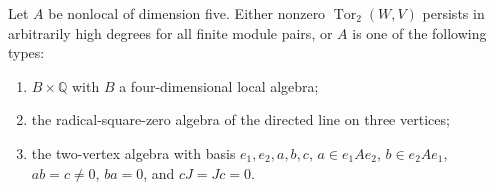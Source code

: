 \begin{lemma}
\label{A:nonlocal-five-target}
Let $A$ be nonlocal of dimension five. Either nonzero
$\operatorname{Tor}_2(W,V)$ persists in arbitrarily high
degrees for all finite module pairs, or $A$ is one of the
following types:
\begin{enumerate}
\item $B\times\mathbb Q$ with $B$ a four-dimensional local algebra;
\item the radical-square-zero algebra of the directed line on
three vertices;
\item the two-vertex algebra with basis $e_1,e_2,a,b,c$,
$a\in e_1Ae_2$, $b\in e_2Ae_1$, $ab=c\ne0$, $ba=0$,
and $cJ=Jc=0$.
\end{enumerate}
\end{lemma}
